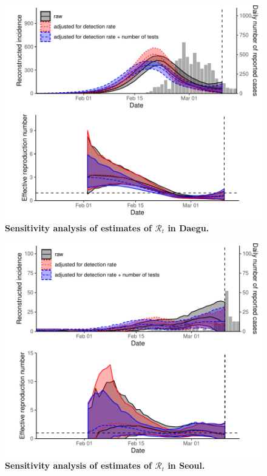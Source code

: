\documentclass[12pt]{article}
\begin{document}
\begin{figure}[!ht]
\includegraphics[width=\textwidth]{figure_R_t_daegu.pdf}
\caption{
\textbf{Sensitivity analysis of estimates of $\mathcal R_t$ in Daegu.}
}
\end{figure}

\pagebreak

\begin{figure}[!ht]
\includegraphics[width=\textwidth]{figure_R_t_seoul.pdf}
\caption{
\textbf{Sensitivity analysis of estimates of $\mathcal R_t$ in Seoul.}
}
\end{figure}
\end{document}
